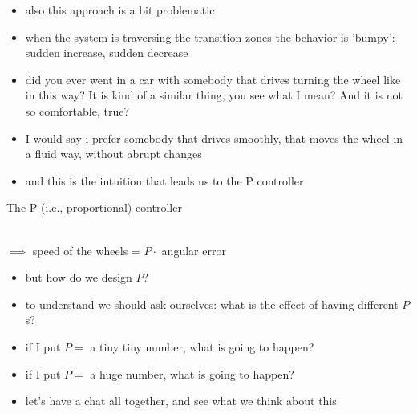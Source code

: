 \begin{frame}
	\begin{itemize}
		\item also this approach is a bit problematic
		\item when the system is traversing the transition zones the behavior is 'bumpy': sudden increase, sudden decrease
		\item did you ever went in a car with somebody that drives turning the wheel like in this way? It is kind of a similar thing, you see what I mean? And it is not so comfortable, true?
		\item I would say i prefer somebody that drives smoothly, that moves the wheel in a fluid way, without abrupt changes 
		\item and this is the intuition that leads us to the P controller
	\end{itemize}
\end{frame}


\begin{frame}{The P (i.e., proportional) controller}
	\begin{center}
		 \\
		$\implies$ speed of the wheels = $P \cdot $ angular error
	\end{center}
\end{frame}


\begin{frame}
	\begin{itemize}
		\item but how do we design $P$?
		\item to understand we should ask ourselves: what is the effect of having different $P$s?
		\item if I put $P = $ a tiny tiny number, what is going to happen?
		\item if I put $P = $ a huge number, what is going to happen?
		\item let's have a chat all together, and see what we think about this
	\end{itemize}
\end{frame}


